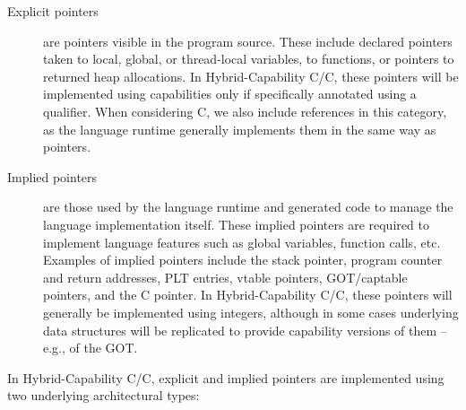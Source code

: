 \documentclass[12pt,twoside,openright,a4paper]{article}
\newcommand{\ccode}[1]{{\small\ttfamily{#1}}}
\newcommand{\uucap}{{\ccode{\_\_capability}}\xspace}
\newcommand{\note}[2]{{\color{blue}[ Note: #1 - #2]}}
\renewcommand{\note}[2]{\relax\ifhmode\unskip\fi}
\newcommand{\psnote}[1]{\note{#1}{Peter S.}}
\newcommand*{\cpp}{\texorpdfstring{C\textsmaller[2]{\protect\nolinebreak[4]\hspace{-.05em}\raisebox{.45ex}{\textbf{++}}}}{C++}}
\newcommand*{\COrCpp}{C/\cpp{}}
\newcommand*{\hybridCOrCpp}{Hybrid-Capability \COrCpp{}}
\begin{document}
\begin{description}
\item[Explicit pointers] are pointers visible in the program source.
  These include declared pointers taken to local, global, or thread-local
  variables, to functions, or pointers to returned heap allocations.
  In \hybridCOrCpp{}, these pointers will be implemented using capabilities
  only if specifically annotated using a \uucap qualifier.
  When considering \cpp, we also include references in this category, as
  the language runtime generally implements them in the same way as pointers.

\item[Implied pointers] are those used by the language runtime and generated
  code to manage the language implementation itself.
  These implied pointers are required to implement language features such as
  global variables, function calls, etc. Examples of implied pointers include
  the stack pointer, program counter and return addresses, PLT
  entries, vtable pointers, GOT/captable pointers, and the \cpp{}
  \ccode{this} pointer.
  \psnote{wonder whether it'd be useful in this document to briefly explain what each of these latter three are for, to make it useful for C/C++ programmers and semanticists who aren't familiar with these internals?}
  \psnote{actually, maybe it's worth (time permitting) explaining all these, including side-by-side how they work in vanilla, pure-cap, and hybrid?}
  In \hybridCOrCpp{}, these pointers will generally be implemented using integers,
  although in some cases
\psnote{probably we should be explicit here about which and why, not just ``eg of the GOT''}
  underlying data structures will be replicated to
  provide capability versions of them -- e.g., of the GOT.
\end{description}

\noindent
In \hybridCOrCpp{}, explicit and implied pointers are implemented using two underlying
architectural types:
\end{document}

